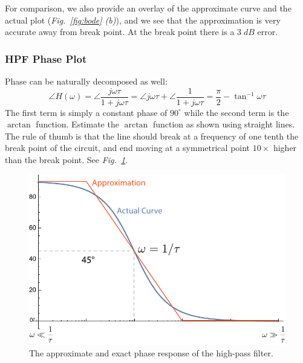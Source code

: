 \noindent
For comparison, we also provide an overlay of the approximate curve and the actual plot (\emph{Fig.~\ref{fig:bode} (b)}), and we see that the approximation is very accurate away from break point.  At the break point there is a $3\;dB$ error.
\newpage
\subsubsection{HPF Phase Plot}
Phase can be naturally decomposed as well:
    \begin{equation}
        \angle H(\omega ) = \angle \frac{{j\omega \tau }}{{1 + j\omega \tau }} = \angle j\omega \tau + \angle \frac{1}{{1 + j\omega \tau }} = \frac{\pi }{2} - {\tan ^{ - 1}}\omega \tau
    \end{equation}
The first term is simply a constant phase of $90^\circ$ while the second term is the $\arctan$ function.  Estimate the $\arctan$ function as shown using straight lines.  The rule of thumb is that the line should break at a frequency of one tenth the break point of the circuit, and end moving at a symmetrical point $10\times$ higher than the break point.  See \emph{Fig.~\ref{fig:bode_phase}}.
\begin{figure}[tb]
\centering
\includegraphics[width=.55\columnwidth]{mod1_3_12_bode4}
\caption{The approximate and exact phase response of the high-pass filter.}
\label{fig:bode_phase}
\end{figure}
